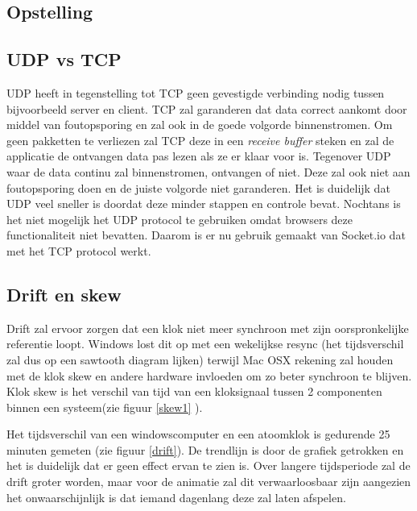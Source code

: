 \subsection{Opstelling}\label{sec:opstelling}


\subsection{UDP vs TCP}

UDP heeft in tegenstelling tot TCP geen gevestigde verbinding nodig tussen bijvoorbeeld server en client. TCP zal garanderen dat data correct aankomt door middel van foutopsporing en zal ook in de goede volgorde binnenstromen. Om geen pakketten te verliezen zal TCP deze in een {\it receive buffer} steken en zal de applicatie de ontvangen data pas lezen als ze er klaar voor is. Tegenover UDP waar de data continu zal binnenstromen, ontvangen of niet. Deze zal ook niet aan foutopsporing doen en de juiste volgorde niet garanderen. Het is duidelijk dat UDP veel sneller is doordat deze minder stappen en controle bevat. Nochtans is het niet mogelijk het UDP protocol te gebruiken omdat browsers deze functionaliteit niet bevatten. Daarom is er nu gebruik gemaakt van Socket.io dat met het TCP protocol werkt.

\subsection{Drift en skew}

Drift zal ervoor zorgen dat een klok niet meer synchroon met zijn oorspronkelijke referentie loopt. Windows lost dit op met een wekelijkse resync (het tijdsverschil zal dus op een sawtooth diagram lijken) terwijl Mac OSX rekening zal houden met de klok skew en andere hardware invloeden om zo beter synchroon te blijven.
Klok skew is het verschil van tijd van een kloksignaal tussen 2 componenten binnen een systeem(zie figuur \ref{skew1} \cite{skew}).

Het tijdsverschil van een windowscomputer en een atoomklok is gedurende 25 minuten gemeten (zie figuur \ref{drift}). De trendlijn is door de grafiek getrokken en het is duidelijk dat er geen effect ervan te zien is. Over langere tijdsperiode zal de drift groter worden, maar voor de animatie zal dit verwaarloosbaar zijn aangezien het onwaarschijnlijk is dat iemand dagenlang deze zal laten afspelen.

